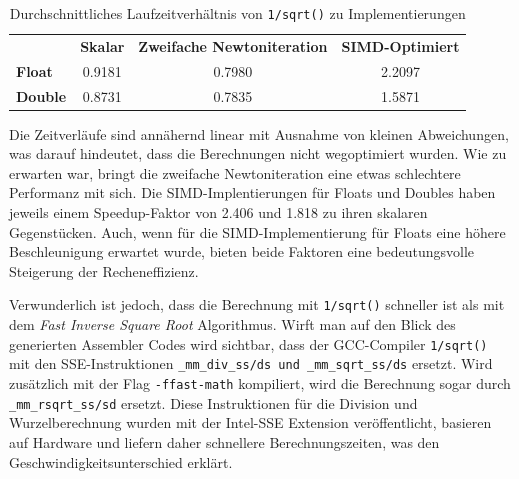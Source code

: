 \documentclass[course=erap]{aspdoc}
\begin{document}
\begin{table}[hbt!]
\centering
\begin{tabular}{l|c|c|c|}
\cline{2-4}
                & \textbf{Skalar} & \textbf{Zweifache Newtoniteration} & \textbf{SIMD-Optimiert} \\ \cline{2-4} 
\textbf{Float}  & 0.9181            & 0.7980                             & 2.2097                  \\ \cline{2-4} 
\textbf{Double} & 0.8731            & 0.7835                             & 1.5871                  \\ \cline{2-4} 
\end{tabular}
\caption{Durchschnittliches Laufzeitverhältnis von \lstinline{1/sqrt()} zu Implementierungen}
\label{tab:captionRuntime}
\end{table}
Die Zeitverläufe sind annähernd linear mit Ausnahme von kleinen Abweichungen, was darauf hindeutet, dass die Berechnungen nicht wegoptimiert wurden. Wie zu erwarten war, bringt die zweifache Newtoniteration eine etwas schlechtere Performanz mit sich. Die SIMD-Implentierungen für Floats und Doubles haben jeweils einem Speedup-Faktor von 2.406 und 1.818 zu ihren skalaren Gegenstücken. Auch, wenn für die SIMD-Implementierung für Floats eine höhere Beschleunigung erwartet wurde, bieten beide Faktoren eine bedeutungsvolle Steigerung der Recheneffizienz. \par 
Verwunderlich ist jedoch, dass die Berechnung mit \lstinline{1/sqrt()} schneller ist als mit dem \emph{Fast Inverse Square Root} Algorithmus. Wirft man auf den Blick des generierten Assembler Codes wird sichtbar, dass der GCC-Compiler \lstinline{1/sqrt()} mit den SSE-Instruktionen \lstinline{_mm_div_ss/ds und _mm_sqrt_ss/ds} ersetzt. Wird zusätzlich mit der Flag \lstinline{-ffast-math} kompiliert, wird die Berechnung sogar durch \lstinline{_mm_rsqrt_ss/sd} ersetzt. Diese Instruktionen für die Division und Wurzelberechnung wurden mit der Intel-SSE Extension veröffentlicht, basieren auf Hardware und liefern daher schnellere Berechnungszeiten, was den Geschwindigkeitsunterschied erklärt.
\end{document}
